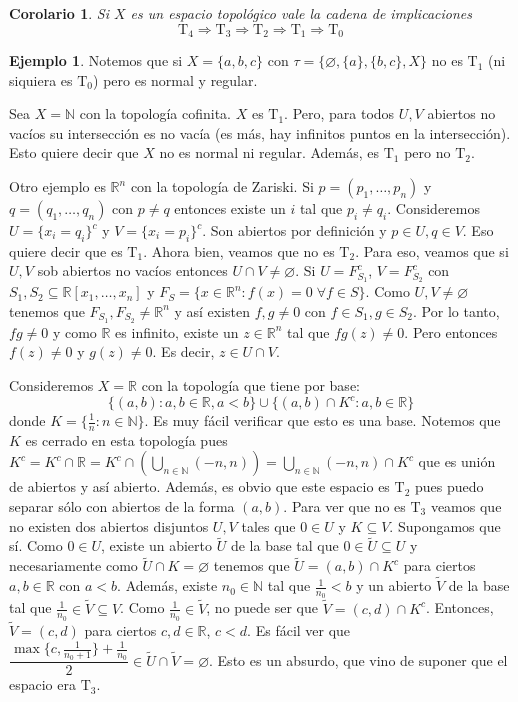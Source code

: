 \documentclass[12pt]{book}
\newtheorem{cor}[teo]{Corolario}
\theoremstyle{definition}
\newtheorem{ex}[teo]{Ejemplo}
\newcommand{\RR}{\mathbb{R}}      %
\newcommand{\NN}{\mathbb{N}}
\let\emptyset\varnothing
\begin{document}
\begin{cor}
Si $X$ es un espacio topológico vale la cadena de implicaciones $$\mathrm{T}_4\Longrightarrow \mathrm{T}_3 \Longrightarrow \mathrm{T}_2\Longrightarrow \mathrm{T}_1\Longrightarrow \mathrm{T}_0$$
\end{cor}

\begin{ex}
Notemos que si $X=\{a,b,c\}$ con $\tau = \{\emptyset, \{a\},\{b,c\},X\}$ no es $\mathrm{T}_1$ (ni siquiera es $\mathrm{T}_0$) pero es normal y regular.

Sea $X=\NN$ con la topología cofinita. $X$ es $\mathrm{T}_1$. Pero, para todos $U,V$ abiertos no vacíos su intersección es no vacía (es más, hay infinitos puntos en la intersección). Esto quiere decir que $X$ no es normal ni regular. Además, es $\mathrm{T}_1$ pero no $\mathrm{T}_2$.

Otro ejemplo es $\RR^n$ con la topología de Zariski. Si $p=(p_1,\ldots , p_n)$ y $q=(q_1,\ldots , q_n)$ con $p\neq q$ entonces existe un $i$ tal que $p_i\neq q_i$. Consideremos $U = \{x_i = q_i\}^c$ y $V=\{x_i = p_i\}^c$. Son abiertos por definición y $p\in U, q\in V$. Eso quiere decir que es $\mathrm{T}_1$. Ahora bien, veamos que no es $\mathrm{T}_2$. Para eso, veamos que si $U,V$ sob abiertos no vacíos entonces $U\cap V\neq \emptyset$. Si $U=F_{S_1}^c$, $V=F_{S_2}^c$ con $S_1,S_2\subseteq \RR[x_1,\ldots , x_n]$ y $F_S=\{x\in\RR^n : f(x) = 0\;\forall f\in S\}$. Como $U,V\neq \emptyset$ tenemos que $F_{S_1},F_{S_2}\neq\RR^n$ y así existen $f,g\neq 0$ con $f\in S_1, g\in S_2$. Por lo tanto, $fg\neq 0$ y como $\RR$ es infinito, existe un $z\in\RR^n$ tal que $fg(z)\neq 0$. Pero entonces $f(z)\neq 0$ y $g(z)\neq 0$. Es decir, $z\in U\cap V$.

Consideremos $X=\RR$ con la topología que tiene por base: $$\{(a,b) : a,b\in\RR, a<b\} \cup \{(a,b)\cap K^c : a,b\in\RR\}$$ donde $K=\{\frac{1}{n}:n\in\NN\}$. Es muy fácil verificar que esto es una base. Notemos que $K$ es cerrado en esta topología pues $K^c = K^c \cap \RR = K^c \cap \left(\displaystyle\bigcup_{n\in\NN} (-n,n)\right) = \bigcup_{n\in\NN} (-n,n)\cap K^c$ que es unión de abiertos y así abierto. Además, es obvio que este espacio es $\mathrm{T}_2$ pues puedo separar sólo con abiertos de la forma $(a,b)$. Para ver que no es $\mathrm{T}_3$ veamos que no existen dos abiertos disjuntos $U,V$ tales que $0\in U$ y $K\subseteq V$. Supongamos que sí. Como $0\in U$, existe un abierto $\tilde{U}$ de la base tal que $0\in \tilde{U}\subseteq U$ y necesariamente como $\tilde{U}\cap K = \emptyset$ tenemos que $\tilde{U} = (a,b)\cap K^c$ para ciertos $a,b\in\RR$ con $a<b$. Además, existe $n_0\in\NN$ tal que $\frac{1}{n_0}<b$ y un abierto $\tilde{V}$ de la base tal que $\frac{1}{n_0}\in\tilde{V}\subseteq V$. Como $\frac{1}{n_0}\in\tilde{V}$, no puede ser que $\tilde{V} = (c,d)\cap K^c$. Entonces, $\tilde{V} = (c,d)$ para ciertos $c,d\in\RR$, $c<d$. Es fácil ver que $\dfrac{\max\{c,\frac{1}{n_0 + 1}\}+\frac{1}{n_0}}{2} \in \tilde{U}\cap\tilde{V} = \emptyset$. Esto es un absurdo, que vino de suponer que el espacio era $\mathrm{T}_3$.


\end{ex}
\end{document}
